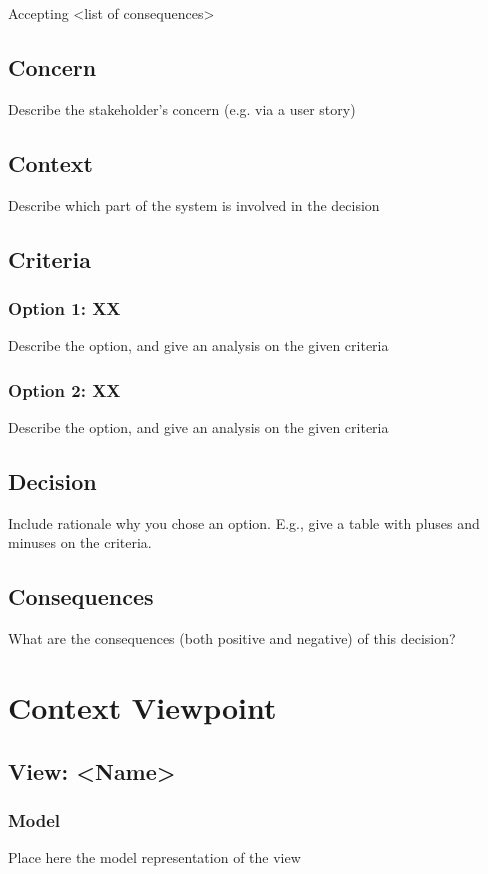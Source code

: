 \documentclass{article}
\begin{document}
Accepting \textless{}list of consequences\textgreater{}

\subsection*{Concern}
Describe the stakeholder’s concern (e.g. via a user story)

\subsection*{Context}
Describe which part of the system is involved in the decision

\subsection*{Criteria}

\subsubsection*{Option 1: XX}
Describe the option, and give an analysis on the given criteria

\subsubsection*{Option 2: XX}
Describe the option, and give an analysis on the given criteria

\subsection*{Decision}
Include rationale why you chose an option. E.g., give a table with pluses and minuses on the criteria.

\subsection*{Consequences}
What are the consequences (both positive and negative) of this decision?

\section*{Context Viewpoint}
\subsection*{View: \textless{}Name\textgreater{}}
\subsubsection*{Model}
Place here the model representation of the view
\end{document}
